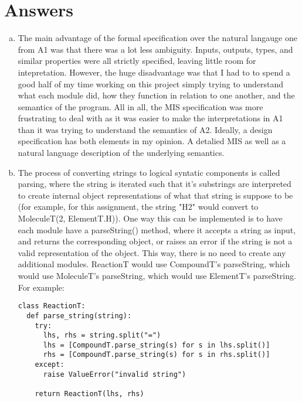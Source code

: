 \documentclass[12pt]{article}
\begin{document}
\section{Answers}
\begin{enumerate}[a)]

\item The main advantage of the formal specification over the natural langauge one from A1 was that there was a lot less ambiguity. Inputs, outputs, types, and similar properties were all strictly specified, leaving little room for intepretation. However, the huge disadvantage was that I had to to spend a good half of my time working on this project simply trying to understand what each module did, how they function in relation to one another, and the semantics of the program. All in all, the MIS specification was more frustrating to deal with as it was easier to make the interpretations in A1 than it was trying to understand the semantics of A2. Ideally, a design specification has both elements in my opinion. A detalied MIS as well as a natural language description of the underlying semantics.

\item The process of converting strings to logical syntatic components is called parsing, where the string is iterated such that it's substrings are interpreted to create internal object representations of what that string is suppose to be (for example, for this assignment, the string "H2" would convert to MoleculeT(2, ElementT.H)). One way this can be implemented is to have each module have a parseString() method, where it accepts a string as input, and returns the corresponding object, or raises an error if the string is not a valid representation of the object. This way, there is no need to create any additional modules. ReactionT would use CompoundT's parseString, which would use MoleculeT's parseString, which would use ElementT's parseString. For example:
\begin{lstlisting}
class ReactionT:
  def parse_string(string):
    try:
      lhs, rhs = string.split("=")
      lhs = [CompoundT.parse_string(s) for s in lhs.split()]
      rhs = [CompoundT.parse_string(s) for s in rhs.split()]
    except:
      raise ValueError("invalid string")

    return ReactionT(lhs, rhs)
\end{lstlisting}


\end{enumerate}
\end{document}
